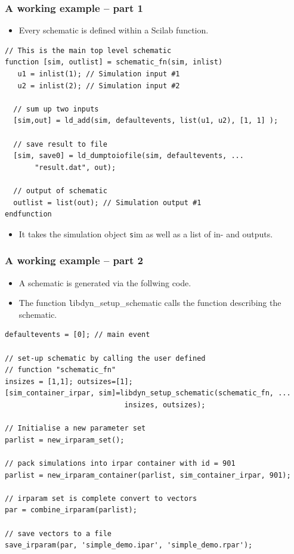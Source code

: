 \documentclass[serif,9pt,xcolor=dvipsnames]{beamer}
\begin{document}
\begin{frame}[fragile]
  \frametitle{A working example -- part 1}

\begin{itemize}
 \item Every schematic is defined within a Scilab function.
\end{itemize}


{\small 
\begin{lstlisting} 
// This is the main top level schematic
function [sim, outlist] = schematic_fn(sim, inlist)
   u1 = inlist(1); // Simulation input #1
   u2 = inlist(2); // Simulation input #2
   
  // sum up two inputs
  [sim,out] = ld_add(sim, defaultevents, list(u1, u2), [1, 1] );
  
  // save result to file
  [sim, save0] = ld_dumptoiofile(sim, defaultevents, ...
       "result.dat", out);
  
  // output of schematic
  outlist = list(out); // Simulation output #1
endfunction
\end{lstlisting}}

\begin{itemize}
 \item It takes the simulation object {\texttt sim} as well as a list of in- and  outputs.
\end{itemize}


\end{frame}


\begin{frame}[fragile]
  \frametitle{A working example -- part 2}

\begin{itemize}
 \item A schematic is generated via the follwing code. 
 \item The function {\texttt libdyn\_setup\_schematic} calls the function describing the schematic.
\end{itemize}


{\small 
\begin{lstlisting} 
defaultevents = [0]; // main event

// set-up schematic by calling the user defined
// function "schematic_fn"
insizes = [1,1]; outsizes=[1];
[sim_container_irpar, sim]=libdyn_setup_schematic(schematic_fn, ...
                            insizes, outsizes);

// Initialise a new parameter set
parlist = new_irparam_set();

// pack simulations into irpar container with id = 901
parlist = new_irparam_container(parlist, sim_container_irpar, 901);

// irparam set is complete convert to vectors
par = combine_irparam(parlist);

// save vectors to a file
save_irparam(par, 'simple_demo.ipar', 'simple_demo.rpar');
\end{lstlisting}}

\end{frame}
\end{document}
